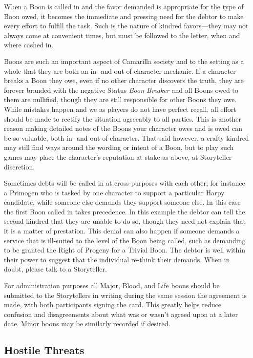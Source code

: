 When a Boon is called in and the favor demanded is appropriate for the type of Boon owed, 
it becomes the immediate and pressing need for the debtor to make every effort to fulfill 
the task.  Such is the nature of kindred favors---they may not always come at convenient 
times, but must be followed to the letter, when and where cashed in.

Boons are such an important aspect of Camarilla society and to the setting as a whole that 
they are both an in- and out-of-character mechanic.  If a character breaks a Boon they owe, 
even if no other character discovers the truth, they are forever branded with the negative 
Status \emph{Boon Breaker} and all Boons owed to them are nullified, though they are still 
responsible for other Boons they owe.  While mistakes happen and we as players do not have 
perfect recall, all effort should be made to rectify the situation agreeably to all parties.  
This is another reason making detailed notes of the Boons your character owes and is owed can 
be so valuable, both in- and out-of-character.  That said however, a crafty kindred may still 
find ways around the wording or intent of a Boon, but to play such games may place the 
character's reputation at stake as above, at Storyteller discretion.

Sometimes debts will be called in at cross-purposes with each other; for instance a Primogen 
who is tasked by one character to support a particular Harpy candidate, while someone else 
demands they support someone else.  In this case the first Boon called in takes precedence.  
In this example the debtor can tell the second kindred that they are unable to do so, though 
they need not explain that it is a matter of prestation.  This denial can also happen if someone 
demands a service that is ill-suited to the level of the Boon being called, such as demanding 
to be granted the Right of Progeny for a Trivial Boon.  The debtor is well within their power to 
suggest that the individual re-think their demands.  When in doubt, please talk to a Storyteller.

For administration purposes all Major, Blood, and Life boons should be submitted to the 
Storytellers in writing during the same session the agreement is made, with both participants 
signing the card.  This greatly helps reduce confusion and disagreements about what was or 
wasn't agreed upon at a later date.  Minor boons may be similarly recorded if desired.

\subsection{Hostile Threats}

